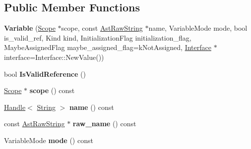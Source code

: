 \subsection*{Public Member Functions}
\begin{DoxyCompactItemize}
\item 
\hypertarget{classv8_1_1internal_1_1_variable_a6a1112709cacfd5d10132a736901c2e4}{}{\bfseries Variable} (\hyperlink{classv8_1_1internal_1_1_scope}{Scope} $\ast$scope, const \hyperlink{classv8_1_1internal_1_1_ast_raw_string}{Ast\+Raw\+String} $\ast$name, Variable\+Mode mode, bool is\+\_\+valid\+\_\+ref, Kind kind, Initialization\+Flag initialization\+\_\+flag, Maybe\+Assigned\+Flag maybe\+\_\+assigned\+\_\+flag=k\+Not\+Assigned, \hyperlink{classv8_1_1internal_1_1_interface}{Interface} $\ast$interface=Interface\+::\+New\+Value())\label{classv8_1_1internal_1_1_variable_a6a1112709cacfd5d10132a736901c2e4}

\item 
\hypertarget{classv8_1_1internal_1_1_variable_a0c6e8b876a9af9e7bdaa83d934271475}{}bool {\bfseries Is\+Valid\+Reference} ()\label{classv8_1_1internal_1_1_variable_a0c6e8b876a9af9e7bdaa83d934271475}

\item 
\hypertarget{classv8_1_1internal_1_1_variable_a5fe7f7fb3c199cb4b5ce46f10a60a527}{}\hyperlink{classv8_1_1internal_1_1_scope}{Scope} $\ast$ {\bfseries scope} () const \label{classv8_1_1internal_1_1_variable_a5fe7f7fb3c199cb4b5ce46f10a60a527}

\item 
\hypertarget{classv8_1_1internal_1_1_variable_a0be10ed92501eb309683ac72d484bda8}{}\hyperlink{classv8_1_1internal_1_1_handle}{Handle}$<$ \hyperlink{classv8_1_1internal_1_1_string}{String} $>$ {\bfseries name} () const \label{classv8_1_1internal_1_1_variable_a0be10ed92501eb309683ac72d484bda8}

\item 
\hypertarget{classv8_1_1internal_1_1_variable_addf4d44d461ddab779dfcfcc86b34cc8}{}const \hyperlink{classv8_1_1internal_1_1_ast_raw_string}{Ast\+Raw\+String} $\ast$ {\bfseries raw\+\_\+name} () const \label{classv8_1_1internal_1_1_variable_addf4d44d461ddab779dfcfcc86b34cc8}

\item 
\hypertarget{classv8_1_1internal_1_1_variable_a3c1c45ca5652d524371b6f2e6faae887}{}Variable\+Mode {\bfseries mode} () const \label{classv8_1_1internal_1_1_variable_a3c1c45ca5652d524371b6f2e6faae887}


\end{DoxyCompactItemize}
